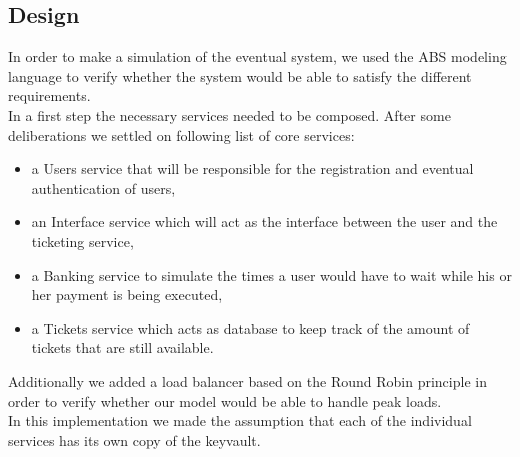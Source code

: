 \documentclass[10pt,a4paper,twocolumn]{article}
\begin{document}
\subsection{Design}
In order to make a simulation of the eventual system, we used the ABS modeling language to verify whether the system would be able to satisfy the different requirements.\\
In a first step the necessary services needed to be composed. After some deliberations we settled on following list of core services:
\begin{itemize}
	\item a Users service that will be responsible for the registration and eventual authentication of users,
	\item an Interface service which will act as the interface between the user and the ticketing service,
	\item a Banking service to simulate the times a user would have to wait while his or her payment is being executed,
	\item a Tickets service which acts as database to keep track of the amount of tickets that are still available.
\end{itemize}
Additionally we added a load balancer based on the Round Robin principle in order to verify whether our model would be able to handle peak loads.\\
In this implementation we made the assumption that each of the individual services has its own copy of the keyvault.
\end{document}
